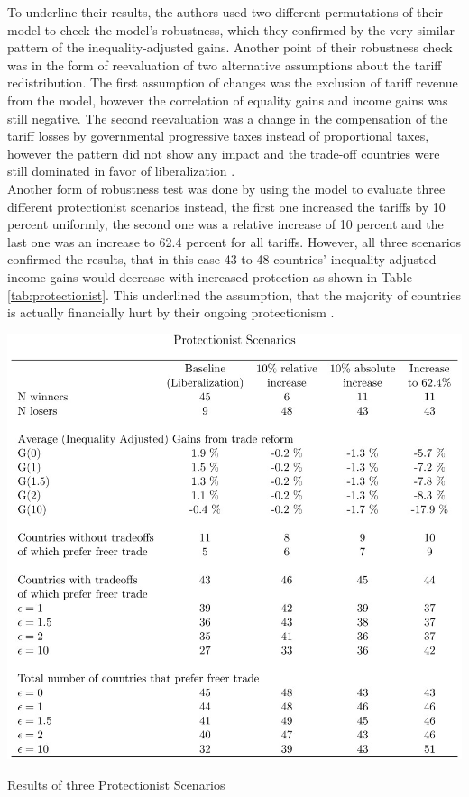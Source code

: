 To underline their results, the authors used two different permutations of their model to check the model's robustness, which they
confirmed by the very similar pattern of the inequality-adjusted gains. Another point of their robustness check was in the form of 
reevaluation of two alternative assumptions about the tariff redistribution. The first assumption of changes was the exclusion of 
tariff revenue from the model, however the correlation of equality gains and income gains was still negative. The second
reevaluation was a change in the compensation of the tariff losses by governmental progressive taxes instead of proportional
taxes, however the pattern did not show any impact and the trade-off countries were still dominated in favor of 
liberalization \parencite[pp.~28-29]{Artuc.2019}. \\
Another form of robustness test was done by using the model to evaluate three different protectionist scenarios instead,
the first one increased the tariffs by 10 percent uniformly, the second one was a relative increase of 10 percent and the last
one was an increase to 62.4 percent for all tariffs. However, all three scenarios confirmed the results, that in this case
43 to 48 countries' inequality-adjusted income gains would decrease with increased protection as shown in Table \ref{tab:protectionist}. 
This underlined the assumption, that the majority of countries is actually financially hurt by their ongoing protectionism \parencite[pp.~29-30]{Artuc.2019}.
\begin{table}[h!]
    \centering
    \includegraphics*[scale=0.4]{graphics/protectionist.jpg}
    \caption{Results of three Protectionist Scenarios \parencite[p.~55]{Artuc.2019}}
    \label{tab:protectionist}
\end{table}\\
